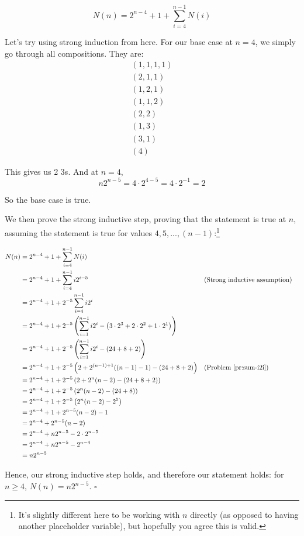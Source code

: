 \begin{equation}
N(n) = 2^{n-4} + 1 + \sum_{i=4}^{n-1} N(i) 
\end{equation}

Let's try using strong induction from here. For our base case at $n = 4$, we simply go through all compositions. They are:
\begin{gather*}
(1, 1, 1, 1) \\
(2, 1, 1) \\
(1, 2, 1) \\
(1, 1, 2) \\
(2, 2) \\
(1, 3) \\
(3, 1) \\
(4)
\end{gather*}

This gives us 2 3s. And at $n = 4$,
\begin{equation*}
n2^{n-5} = 4 \cdot 2^{4-5} = 4 \cdot 2^{-1} = 2
\end{equation*}

So the base case is true.

We then prove the strong inductive step, proving that the statement is true at $n$, assuming the statement is true for values $4, 5, ..., (n-1)$:\footnote{It's slightly different here to be working with $n$ directly (as opposed to having another placeholder variable), but hopefully you agree this is valid.}

\begin{align*}
N(n) &= 2^{n-4} + 1 + \sum_{i=4}^{n-1} N(i) \\
&= 2^{n-4} + 1 + \sum_{i=4}^{n-1} i2^{i-5} && \text{(Strong inductive assumption)} \\
&= 2^{n-4} + 1 + 2^{-5} \sum_{i=4}^{n-1} i2^{i} \\
&= 2^{n-4} + 1 + 2^{-5} \left(\sum_{i=1}^{n-1} i2^{i} - \left( 3 \cdot 2^3 + 2 \cdot 2^2 + 1 \cdot 2^1 \right) \right) \\
&= 2^{n-4} + 1 + 2^{-5} \left(\sum_{i=1}^{n-1} i2^{i} - (24 + 8 + 2) \right) \\
&= 2^{n-4} + 1 + 2^{-5} \left(2 + 2^{(n-1)+1}((n-1)-1) - (24 + 8 + 2) \right) && \text{(Problem \ref{pr:sum-i2i})} \\
&= 2^{n-4} + 1 + 2^{-5} \left(2 + 2^{n}(n-2) - (24 + 8 + 2) \right) \\
&= 2^{n-4} + 1 + 2^{-5} \left(2^{n}(n-2) - (24 + 8) \right) \\
&= 2^{n-4} + 1 + 2^{-5} \left(2^{n}(n-2) - 2^5 \right) \\
&= 2^{n-4} + 1 + 2^{n-5}(n-2) - 1 \\
&= 2^{n-4} + 2^{n-5}(n-2) \\
&= 2^{n-4} + n2^{n-5} - 2 \cdot 2^{n-5} \\
&= 2^{n-4} + n2^{n-5} - 2^{n-4} \\
&= n2^{n-5}
\end{align*}

Hence, our strong inductive step holds, and therefore our statement holds: for $n \geq 4$, $N(n) = n2^{n-5}$. $\square$


